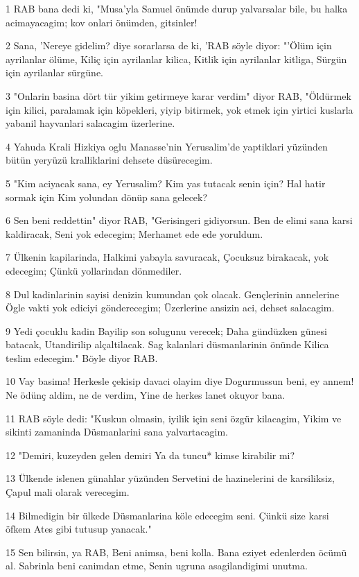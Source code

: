 \par 1 RAB bana dedi ki, "Musa'yla Samuel önümde durup yalvarsalar bile, bu halka acimayacagim; kov onlari önümden, gitsinler!
\par 2 Sana, 'Nereye gidelim? diye sorarlarsa de ki, 'RAB söyle diyor: "'Ölüm için ayrilanlar ölüme, Kiliç için ayrilanlar kilica, Kitlik için ayrilanlar kitliga, Sürgün için ayrilanlar sürgüne.
\par 3 "Onlarin basina dört tür yikim getirmeye karar verdim" diyor RAB, "Öldürmek için kilici, paralamak için köpekleri, yiyip bitirmek, yok etmek için yirtici kuslarla yabanil hayvanlari salacagim üzerlerine.
\par 4 Yahuda Krali Hizkiya oglu Manasse'nin Yerusalim'de yaptiklari yüzünden bütün yeryüzü kralliklarini dehsete düsürecegim.
\par 5 "Kim aciyacak sana, ey Yerusalim? Kim yas tutacak senin için? Hal hatir sormak için Kim yolundan dönüp sana gelecek?
\par 6 Sen beni reddettin" diyor RAB, "Gerisingeri gidiyorsun. Ben de elimi sana karsi kaldiracak, Seni yok edecegim; Merhamet ede ede yoruldum.
\par 7 Ülkenin kapilarinda, Halkimi yabayla savuracak, Çocuksuz birakacak, yok edecegim; Çünkü yollarindan dönmediler.
\par 8 Dul kadinlarinin sayisi denizin kumundan çok olacak. Gençlerinin annelerine Ögle vakti yok ediciyi gönderecegim; Üzerlerine ansizin aci, dehset salacagim.
\par 9 Yedi çocuklu kadin Bayilip son solugunu verecek; Daha gündüzken günesi batacak, Utandirilip alçaltilacak. Sag kalanlari düsmanlarinin önünde Kilica teslim edecegim." Böyle diyor RAB.
\par 10 Vay basima! Herkesle çekisip davaci olayim diye Dogurmussun beni, ey annem! Ne ödünç aldim, ne de verdim, Yine de herkes lanet okuyor bana.
\par 11 RAB söyle dedi: "Kuskun olmasin, iyilik için seni özgür kilacagim, Yikim ve sikinti zamaninda Düsmanlarini sana yalvartacagim.
\par 12 "Demiri, kuzeyden gelen demiri Ya da tuncu* kimse kirabilir mi?
\par 13 Ülkende islenen günahlar yüzünden Servetini de hazinelerini de karsiliksiz, Çapul mali olarak verecegim.
\par 14 Bilmedigin bir ülkede Düsmanlarina köle edecegim seni. Çünkü size karsi öfkem Ates gibi tutusup yanacak."
\par 15 Sen bilirsin, ya RAB, Beni animsa, beni kolla. Bana eziyet edenlerden öcümü al. Sabrinla beni canimdan etme, Senin ugruna asagilandigimi unutma.
